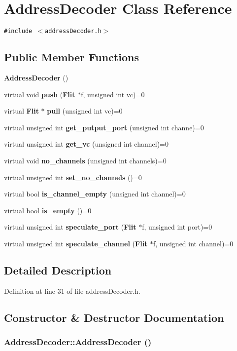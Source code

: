 \section{AddressDecoder Class Reference}
\label{classAddressDecoder}
{\tt \#include $<$addressDecoder.h$>$}

\subsection*{Public Member Functions}
\begin{CompactItemize}
\item 
{\bf AddressDecoder} ()
\item 
virtual void {\bf push} ({\bf Flit} $\ast$f, unsigned int vc)=0
\item 
virtual {\bf Flit} $\ast$ {\bf pull} (unsigned int vc)=0
\item 
virtual unsigned int {\bf get\_\-putput\_\-port} (unsigned int channe)=0
\item 
virtual unsigned int {\bf get\_\-vc} (unsigned int channel)=0
\item 
virtual void {\bf no\_\-channels} (unsigned int channels)=0
\item 
virtual unsigned int {\bf set\_\-no\_\-channels} ()=0
\item 
virtual bool {\bf is\_\-channel\_\-empty} (unsigned int channel)=0
\item 
virtual bool {\bf is\_\-empty} ()=0
\item 
virtual unsigned int {\bf speculate\_\-port} ({\bf Flit} $\ast$f, unsigned int port)=0
\item 
virtual unsigned int {\bf speculate\_\-channel} ({\bf Flit} $\ast$f, unsigned int channel)=0
\end{CompactItemize}


\subsection{Detailed Description}


Definition at line 31 of file addressDecoder.h.

\subsection{Constructor \& Destructor Documentation}
\subsubsection[{AddressDecoder}]{\setlength{\rightskip}{0pt plus 5cm}AddressDecoder::AddressDecoder ()}\label{classAddressDecoder_6b0422d043465fb94496c5b18670eaa9}




